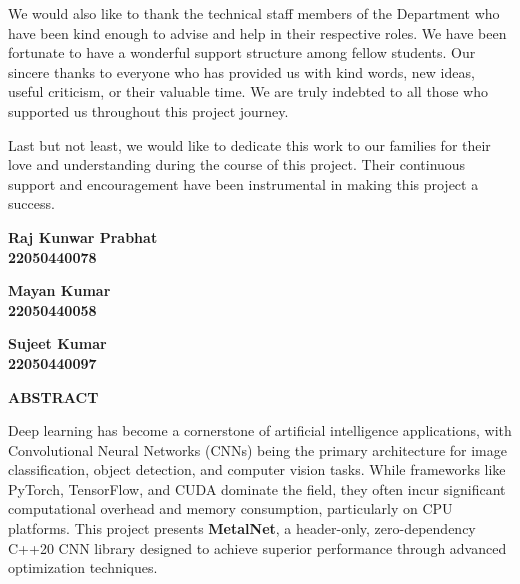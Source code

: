 \documentclass[12pt,oneside,a4paper]{report}
\begin{document}
We would also like to thank the technical staff members of the Department who have been kind enough to advise and help in their respective roles. We have been fortunate to have a wonderful support structure among fellow students. Our sincere thanks to everyone who has provided us with kind words, new ideas, useful criticism, or their valuable time. We are truly indebted to all those who supported us throughout this project journey.

Last but not least, we would like to dedicate this work to our families for their love and understanding during the course of this project. Their continuous support and encouragement have been instrumental in making this project a success.

\vspace{3cm}

\begin{flushright}
\textbf{Raj Kunwar Prabhat\\
22050440078}

\vspace{0.5cm}

\textbf{Mayan Kumar\\
22050440058}

\vspace{0.5cm}

\textbf{Sujeet Kumar\\
22050440097}
\end{flushright}

\newpage

\thispagestyle{empty}
\vspace*{1cm}
\begin{center}
    \textbf{\Large ABSTRACT}
\end{center}

\vspace{1.5cm}

Deep learning has become a cornerstone of artificial intelligence applications, with Convolutional Neural Networks (CNNs) being the primary architecture for image classification, object detection, and computer vision tasks. While frameworks like PyTorch, TensorFlow, and CUDA dominate the field, they often incur significant computational overhead and memory consumption, particularly on CPU platforms. This project presents \textbf{MetalNet}, a header-only, zero-dependency C++20 CNN library designed to achieve superior performance through advanced optimization techniques.
\end{document}
